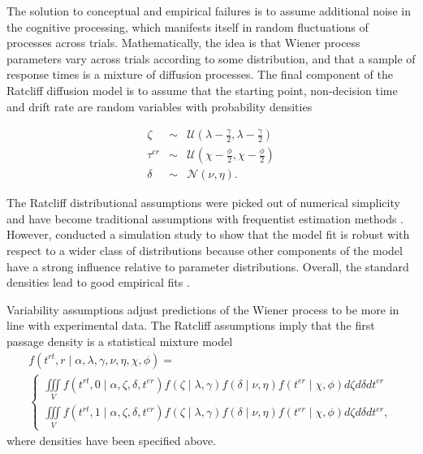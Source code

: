 \documentclass[12pt]{article}
\begin{document}
	The solution to conceptual and empirical failures is to assume additional noise in the cognitive processing, which manifests itself in random fluctuations of processes across trials. Mathematically, the idea is that Wiener process parameters vary across trials according to some distribution, and that a sample of response times is a mixture of diffusion processes. The final component of the Ratcliff diffusion model is to assume that the starting point, non-decision time and drift rate are random variables with probability densities

\begin{eqnarray}
\zeta & \sim & \mathcal{U}(\lambda - \frac{\gamma}{2}, 
\lambda - \frac{\gamma}{2}) \nonumber \\
\tau^{er} & \sim & \mathcal{U}(\chi - \frac{\phi}{2}, 
\chi - \frac{\phi}{2}) \nonumber \\
\delta & \sim & \mathcal{N}(\nu, \eta).
\end{eqnarray}

	The Ratcliff distributional assumptions were picked out of numerical simplicity \citep{RatTue2002} and have become traditional assumptions with frequentist estimation methods \citep{Tue2004,VanTue2007,VosVos2007}. However, \citep{Rat2013} conducted a simulation study to show that the model fit is robust with respect to a wider class of distributions because other components of the model have a strong influence relative to parameter distributions. Overall, the standard densities lead to good empirical fits \citep{RatMck2008,Wag2009}.
    
	Variability assumptions adjust predictions of the Wiener process to be more in line with experimental data. The Ratcliff assumptions imply that the first passage density is a statistical mixture model
\begin{gather}
f(t^{rt}, r \mid \alpha, \lambda, \gamma, \nu, \eta, \chi, \phi) = \nonumber \\ 
\begin{cases}
\iiint\limits_V f(t^{rt}, 0 \mid \alpha, \zeta, \delta, t^{er})f(\zeta \mid \lambda, \gamma)f(\delta \mid \nu, \eta)f(t^{er} \mid \chi, \phi)d\zeta d\delta dt^{er} \\
\iiint\limits_V f(t^{rt}, 1 \mid \alpha, \zeta, \delta, t^{er})f(\zeta \mid \lambda, \gamma)f(\delta \mid \nu, \eta)f(t^{er} \mid \chi, \phi)d\zeta d\delta dt^{er},
\end{cases}
\end{gather}
where densities have been specified above.
\end{document}
